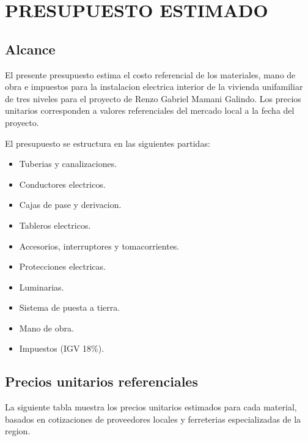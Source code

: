 \chapter{PRESUPUESTO ESTIMADO}

\section{Alcance}

El presente presupuesto estima el costo referencial de los materiales, mano de obra e impuestos para la instalacion electrica interior de la vivienda unifamiliar de tres niveles para el proyecto de Renzo Gabriel Mamani Galindo. Los precios unitarios corresponden a valores referenciales del mercado local a la fecha del proyecto.

El presupuesto se estructura en las siguientes partidas:
\begin{itemize}
  \item Tuberias y canalizaciones.
  \item Conductores electricos.
  \item Cajas de pase y derivacion.
  \item Tableros electricos.
  \item Accesorios, interruptores y tomacorrientes.
  \item Protecciones electricas.
  \item Luminarias.
  \item Sistema de puesta a tierra.
  \item Mano de obra.
  \item Impuestos (IGV 18\%).
\end{itemize}

\section{Precios unitarios referenciales}

La siguiente tabla muestra los precios unitarios estimados para cada material, basados en cotizaciones de proveedores locales y ferreterias especializadas de la region.

